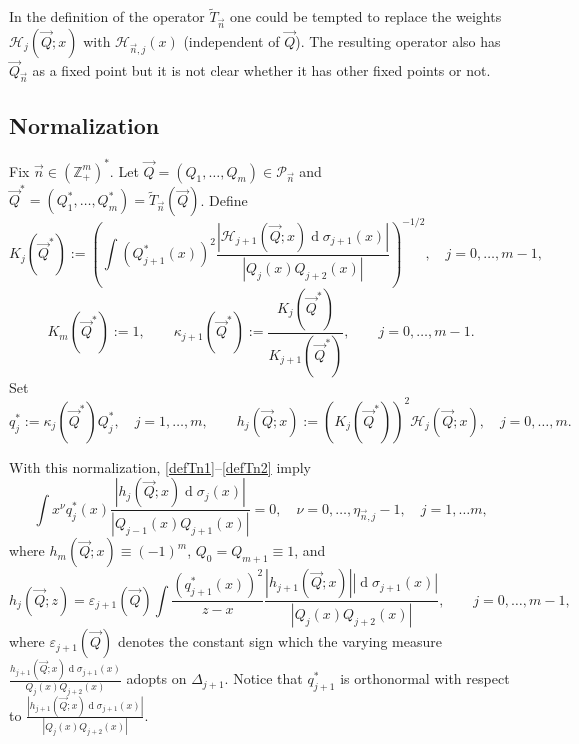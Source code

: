 \documentclass{amsart}
\numberwithin{equation}{section}
\theoremstyle{definition}
\DeclareMathOperator{\D}{d}        %
\newcommand{\ZZ}{\mathbb{Z}}      %
\newcommand{\n}{\vec{n}}          %
\begin{document}
    In the definition of the operator $\tilde{T}_{\n}$ one could be tempted to replace the weights $\mathcal{H}_j(\vec{Q};x)$ with $\mathcal{H}_{\n,j}(x)$ (independent of $\vec{Q}$). The resulting operator also has $\vec{Q}_{\n}$ as a fixed point but it is not clear whether it has other fixed points or not.

\subsection{Normalization}  \label{normalization}

    Fix $\n \in (\ZZ_+^m)^*$. Let $\vec{Q} = (Q_1,\ldots,Q_m) \in \mathcal{P}_{\n}$ and $\vec{Q}^* = (Q_1^*,\ldots,Q_m^*) = \tilde{T}_{\n}(\vec{Q})$. Define
    \[
      K_j(\vec{Q}^*) := \left(\int (Q^*_{j+1}(x))^2 \frac{| \mathcal{H}_{j+1}(\vec{Q};x)\D \sigma_{j+1}(x)|}{| {Q}_{j}(x) {Q}_{j+2}(x)|}\right)^{-1/2},\quad j=0,\ldots,m-1,
    \]
    \[
      K_{m}(\vec{Q}^*):= 1,\qquad
      \kappa_{j+1}(\vec{Q}^*):= \frac{K_{ j}(\vec{Q}^*)}{K_{ j+1}(\vec{Q}^*)},\qquad j=0,\ldots,m-1.
    \]
    Set
    \begin{equation*}
        q_{j}^* := \kappa_{ j}(\vec{Q}^*)Q_{ j}^*, \quad j=1,\ldots,m, \qquad  {h}_{ j}(\vec{Q};x) := (K_{j}(\vec{Q}^*))^2 \mathcal{H}_{j}(\vec{Q};x) ,\quad j=0,\ldots,m.
    \end{equation*}

    With this normalization, \eqref{defTn1}--\eqref{defTn2} imply
    \[
        \int x^\nu q_{j}^*(x)\frac{| {h}_{j}( {\vec{Q}};x)\D \sigma_{j}(x)|}{ |{Q}_{j-1}(x) {Q}_{j+1}(x)|} =0,\quad \nu=0,\ldots,\eta_{\n,j} -1, \quad j=1,\ldots m,
    \]
    where $ {h}_{m}({\vec{Q}};x) \equiv (-1)^m$, $Q_0 = Q_{m+1} \equiv 1$, and
    \begin{equation}
    	\label{defTn12}
        {h}_{j}( {\vec{Q}};z) = \varepsilon_{j+1}(\vec{Q})\int \frac{(q^*_{j+1}(x))^2}{z-x}\frac{| {h}_{j+1}( {\vec{Q}};x)| |\D\sigma_{j+1}(x)|}{| {Q}_{j}(x) {Q}_{j+2}(x)|}, \qquad j=0,\ldots,m-1,
    \end{equation}
    where $\varepsilon_{j+1}(\vec{Q})$ denotes the constant sign which the varying measure $\frac{{h}_{j+1}( {\vec{Q}};x) \D\sigma_{j+1}(x)}{{Q}_{j}(x) {Q}_{j+2}(x)}$ adopts on $\Delta_{j+1}$. Notice that $q^*_{j+1}$ is orthonormal with respect to $ \frac{|{h}_{j+1}( {\vec{Q}};x)\D\sigma_{j+1}(x)|}{|{Q}_{j}(x) {Q}_{j+2}(x)|}$.
\end{document}
